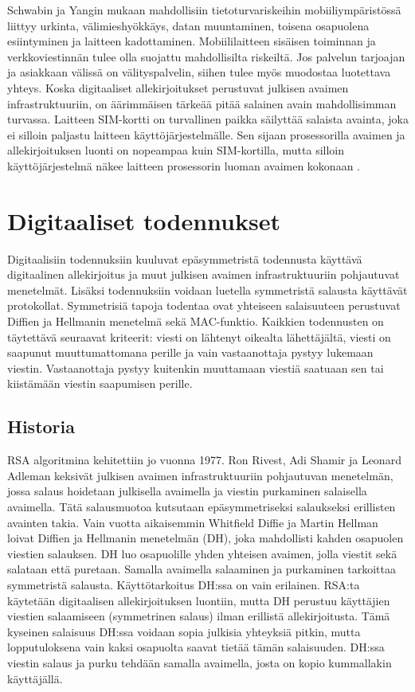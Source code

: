 \documentclass[finnish]{tktltiki2}
\theoremstyle{definition}
\theoremstyle{remark}
\begin{document}
Schwabin ja Yangin mukaan \cite{enti} mahdollisiin tietoturvariskeihin mobiiliympäristössä liittyy urkinta, välimieshyökkäys, datan muuntaminen, toisena osapuolena esiintyminen ja laitteen kadottaminen. Mobiililaitteen sisäisen toiminnan ja verkkoviestinnän tulee olla suojattu mahdollisilta riskeiltä. Jos palvelun tarjoajan ja asiakkaan välissä on välityspalvelin, siihen tulee myös muodostaa luotettava yhteys. Koska digitaaliset allekirjoitukset perustuvat julkisen avaimen infrastruktuuriin, on äärimmäisen tärkeää pitää salainen avain mahdollisimman turvassa. Laitteen SIM-kortti on turvallinen paikka säilyttää salaista avainta, joka ei silloin paljastu laitteen käyttöjärjestelmälle. Sen sijaan prosessorilla avaimen ja allekirjoituksen luonti on nopeampaa kuin SIM-kortilla, mutta silloin käyttöjärjestelmä näkee laitteen prosessorin luoman avaimen kokonaan \cite{proxy}.        


\section{Digitaaliset todennukset}

Digitaalisiin todennuksiin kuuluvat epäsymmetristä todennusta käyttävä digitaalinen allekirjoitus ja muut julkisen avaimen infrastruktuuriin pohjautuvat menetelmät. Lisäksi todennuksiin voidaan luetella symmetristä salausta käyttävät protokollat. Symmetrisiä tapoja todentaa ovat yhteiseen salaisuuteen perustuvat Diffien ja Hellmanin menetelmä sekä MAC-funktio. Kaikkien todennusten on täytettävä seuraavat kriteerit: viesti on lähtenyt oikealta lähettäjältä, viesti on saapunut muuttumattomana perille ja vain vastaanottaja pystyy lukemaan viestin. Vastaanottaja pystyy kuitenkin muuttamaan viestiä saatuaan sen tai kiistämään viestin saapumisen perille.

\subsection{Historia}

RSA algoritmina kehitettiin jo vuonna 1977. Ron Rivest, Adi Shamir ja Leonard Adleman \cite{rsa78} keksivät julkisen avaimen infrastruktuuriin pohjautuvan menetelmän, jossa salaus hoidetaan julkisella avaimella ja viestin purkaminen salaisella avaimella. Tätä salausmuotoa kutsutaan epäsymmetriseksi salaukseksi erillisten avainten takia. Vain vuotta aikaisemmin Whitfield Diffie ja Martin Hellman \cite{dh76} loivat Diffien ja Hellmanin menetelmän (DH), joka mahdollisti kahden osapuolen viestien salauksen. DH luo osapuolille yhden yhteisen avaimen, jolla viestit sekä salataan että puretaan. Samalla avaimella salaaminen ja purkaminen tarkoittaa symmetristä salausta. Käyttötarkoitus DH:ssa on vain erilainen. RSA:ta käytetään digitaalisen allekirjoituksen luontiin, mutta DH perustuu käyttäjien viestien salaamiseen (symmetrinen salaus) ilman erillistä allekirjoitusta. Tämä kyseinen salaisuus DH:ssa voidaan sopia julkisia yhteyksiä pitkin, mutta lopputuloksena vain kaksi osapuolta saavat tietää tämän salaisuuden. DH:ssa viestin salaus ja purku tehdään samalla avaimella, josta on kopio kummallakin käyttäjällä.
\end{document}

